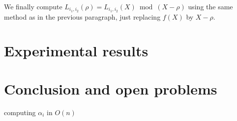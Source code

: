 \documentclass{sig-alternate}
\begin{document}
We finally compute $L_{i_1,i_2}(\rho)=L_{i_1,i_2}(X)\bmod(X-\rho)$ using the same method as in the previous paragraph, just replacing $f(X)$ by $X-\rho$.







\section{Experimental results}

\section{Conclusion and open problems}

computing $\alpha_i$ in $O(n)$




\end{document}
